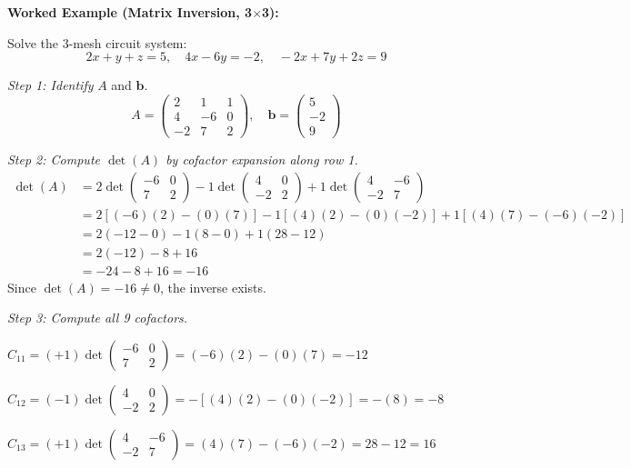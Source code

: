 \documentclass[12pt,a4paper]{article}
\begin{document}
\textbf{Worked Example (Matrix Inversion, 3$\times$3):}

Solve the 3-mesh circuit system:
\[
2x + y + z = 5, \quad 4x - 6y = -2, \quad -2x + 7y + 2z = 9
\]

\textit{Step 1: Identify} \(A\) and \(\mathbf{b}\).
\[
A = \begin{pmatrix} 2 & 1 & 1 \\ 4 & -6 & 0 \\ -2 & 7 & 2 \end{pmatrix}, \quad \mathbf{b} = \begin{pmatrix} 5 \\ -2 \\ 9 \end{pmatrix}
\]

\textit{Step 2: Compute \(\det(A)\) by cofactor expansion along row 1.}
\begin{align*}
\det(A) &= 2\det\begin{pmatrix}-6&0\\7&2\end{pmatrix}
          - 1\det\begin{pmatrix}4&0\\-2&2\end{pmatrix}
          + 1\det\begin{pmatrix}4&-6\\-2&7\end{pmatrix} \\
&= 2[(-6)(2)-(0)(7)] - 1[(4)(2)-(0)(-2)] + 1[(4)(7)-(-6)(-2)] \\
&= 2(-12-0) - 1(8-0) + 1(28-12) \\
&= 2(-12) - 8 + 16 \\
&= -24 - 8 + 16 = -16
\end{align*}
Since \(\det(A) = -16 \neq 0\), the inverse exists.

\textit{Step 3: Compute all 9 cofactors.}

\(C_{11} = (+1)\det\begin{pmatrix}-6&0\\7&2\end{pmatrix} = (-6)(2)-(0)(7) = -12\)

\(C_{12} = (-1)\det\begin{pmatrix}4&0\\-2&2\end{pmatrix} = -[(4)(2)-(0)(-2)] = -(8) = -8\)

\(C_{13} = (+1)\det\begin{pmatrix}4&-6\\-2&7\end{pmatrix} = (4)(7)-(-6)(-2) = 28-12 = 16\)
\end{document}
